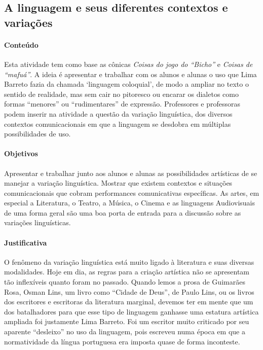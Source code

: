 \documentclass{extarticle}
\begin{document}
\subsection{A linguagem e seus diferentes contextos e variações}


\paragraph{Conteúdo} Esta atividade tem como base as cônicas
{\textit{Coisas do jogo do ``Bicho''}} e {\textit{Coisas de
``mafuá''}}. A ideia é apresentar e trabalhar com os alunos e alunas o
uso que Lima Barreto fazia da chamada `linguagem coloquial', de modo a
ampliar no texto o sentido de realidade, mas sem cair no pitoresco ou
encarar os dialetos como formas ``menores'' ou ``rudimentares'' de
expressão. Professores e professoras podem inserir na atividade a
questão da variação linguística, dos diversos contextos comunicacionais
em que a linguagem se desdobra em múltiplas possibilidades de uso.

\paragraph{Objetivos} Apresentar e trabalhar junto aos alunos e alunas as
possibilidades artísticas de se manejar a variação linguística. Mostrar
que existem contextos e situações comunicacionais que cobram
performances comunicativas específicas. As artes, em especial a
Literatura, o Teatro, a Música, o Cinema e as linguagens Audiovisuais de
uma forma geral são uma boa porta de entrada para a discussão sobre as
variações linguísticas.


\paragraph{Justificativa} O fenômeno da variação linguística está muito
ligado à literatura e suas diversas modalidades. Hoje em dia, as regras
para a criação artística não se apresentam tão inflexíveis quanto foram
no passado. Quando lemos a prosa de Guimarães Rosa, Osman Lins, um livro
como ``Cidade de Deus'', de Paulo Lins, ou os livros dos escritores e
escritoras da literatura marginal, devemos ter em mente que um dos
batalhadores para que esse tipo de linguagem ganhasse uma estatura
artística ampliada foi justamente Lima Barreto. Foi um escritor muito
criticado por seu aparente ``desleixo'' no uso da linguagem, pois
escreveu numa época em que a normatividade da língua portuguesa era
imposta quase de forma inconteste.
\end{document}
